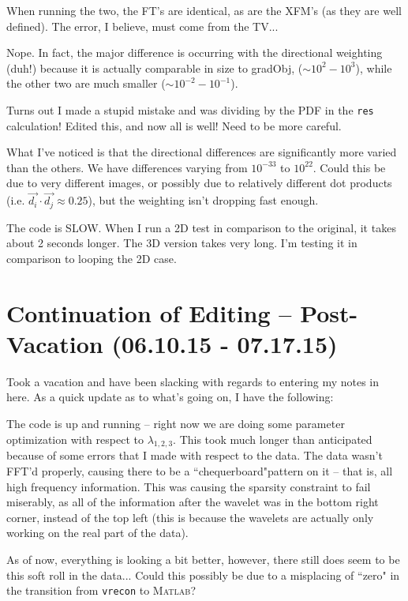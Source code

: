 \documentclass[11 pt]{article}
\let\oldsection\section
\renewcommand\section{\clearpage\newpage\oldsection}
\begin{document}
    When running the two, the FT's are identical, as are the XFM's (as they are well defined). The error, I believe, must come from the TV... 

    Nope. In fact, the major difference is occurring with the directional weighting (duh!) because it is actually comparable in size to gradObj, ($\sim 10^2 - 10^3$), while the other two are much smaller ($\sim 10^{-2} - 10^{-1}$).

    Turns out I made a stupid mistake and was dividing by the PDF in the \texttt{res} calculation! Edited this, and now all is well! Need to be more careful.

    What I've noticed is that the directional differences are significantly more varied than the others. We have differences varying from $10^{-33}$ to $10^{22}$. Could this be due to very different images, or possibly due to relatively different dot products (i.e. $\vec{d_i}\cdot\vec{d_j} \approx 0.25$), but the weighting isn't dropping fast enough. 

    The code is SLOW. When I run a 2D test in comparison to the original, it takes about 2 seconds longer. The 3D version takes very long. I'm testing it in comparison to looping the 2D case. 

\section{Continuation of Editing -- Post-Vacation (06.10.15 - 07.17.15)}
  
  Took a vacation and have been slacking with regards to entering my notes in here. As a quick update as to what's going on, I have the following:

  The code is up and running -- right now we are doing some parameter optimization with respect to $\lambda_{1,2,3}$. This took much longer than anticipated because of some errors that I made with respect to the data. The data wasn't FFT'd properly, causing there to be a ``chequerboard"pattern on it -- that is, all high frequency information. This was causing the sparsity constraint to fail miserably, as all of the information after the wavelet was in the bottom right corner, instead of the top left (this is because the wavelets are actually only working on the real part of the data). 

  As of now, everything is looking a bit better, however, there still does seem to be this soft roll in the data... Could this possibly be due to a misplacing of ``zero" in the transition from \texttt{vrecon} to \textsc{Matlab}?
\end{document}
